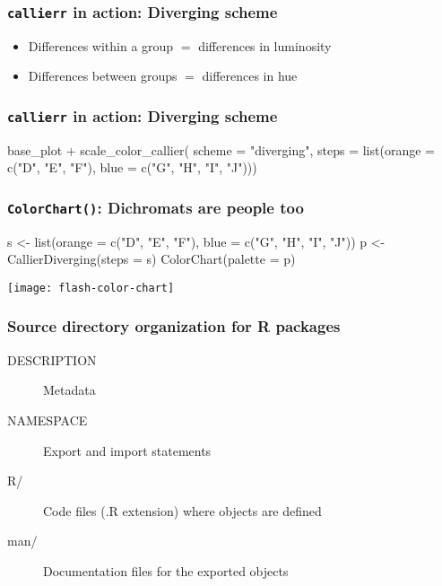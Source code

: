 \documentclass{beamer}
\begin{document}
\begin{frame}
\frametitle{\texttt{callierr} in action: Diverging scheme}

\vspace{2em}

\begin{itemize}
 \item Differences within a group $=$ differences in luminosity
 \item Differences between groups $=$ differences in hue
\end{itemize}
\end{frame}

\begin{frame}[fragile,t]
\frametitle{\texttt{callierr} in action: Diverging scheme}
\begin{listing}{1}
base_plot +
  scale_color_callier(
    scheme = "diverging",
    steps = list(orange = c("D", "E", "F"),
                 blue = c("G", "H", "I", "J")))
\end{listing}
\end{frame}



\begin{frame}[fragile]
\frametitle{\texttt{ColorChart()}: Dichromats are people too}
\begin{listing}{1}
s <- list(orange = c("D", "E", "F"), 
          blue = c("G", "H", "I", "J"))
p <- CallierDiverging(steps = s)
ColorChart(palette = p)
\end{listing}

\hspace{-0.7cm}
\texttt{[image: flash-color-chart]}
\end{frame}



\begin{frame}
\frametitle{Source directory organization for R packages}
\begin{description}
 \item [{\scriptsize DESCRIPTION}] Metadata
 \item [{\scriptsize NAMESPACE}] Export and import statements
 \item [R/] Code files (.R extension) where objects are defined
 \item [man/] Documentation files for the exported objects
\end{description}
\end{frame}
\end{document}
